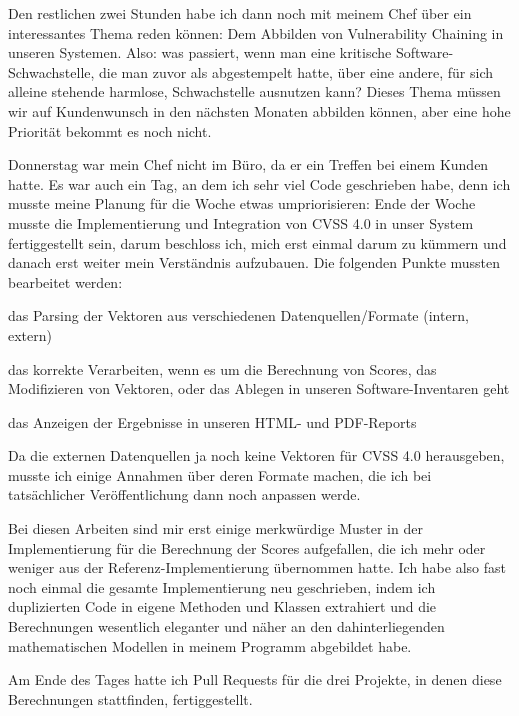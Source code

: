 Den restlichen zwei Stunden habe ich dann noch mit meinem Chef über ein interessantes Thema reden können: Dem Abbilden von Vulnerability Chaining in unseren Systemen.
Also: was passiert, wenn man eine kritische Software-Schwachstelle, die man zuvor als  abgestempelt hatte, über eine andere, für sich alleine stehende harmlose, Schwachstelle ausnutzen kann?
Dieses Thema müssen wir auf Kundenwunsch in den nächsten Monaten abbilden können, aber eine hohe Priorität bekommt es noch nicht.


Donnerstag war mein Chef nicht im Büro, da er ein Treffen bei einem Kunden hatte.
Es war auch ein Tag, an dem ich sehr viel Code geschrieben habe, denn ich musste meine Planung für die Woche etwas umpriorisieren:
Ende der Woche musste die Implementierung und Integration von CVSS 4.0 in unser System fertiggestellt sein, darum beschloss ich, mich erst einmal darum zu kümmern und danach erst weiter mein Verständnis aufzubauen.
Die folgenden Punkte mussten bearbeitet werden:

\begin{smitemize}
    \item das Parsing der Vektoren aus verschiedenen Datenquellen/Formate (intern, extern)
    \item das korrekte Verarbeiten, wenn es um die Berechnung von Scores, das Modifizieren von Vektoren, oder das Ablegen in unseren Software-Inventaren geht
    \item das Anzeigen der Ergebnisse in unseren HTML- und PDF-Reports
\end{smitemize}

Da die externen Datenquellen ja noch keine Vektoren für CVSS 4.0 herausgeben, musste ich einige Annahmen über deren Formate machen, die ich bei tatsächlicher Veröffentlichung dann noch anpassen werde.

Bei diesen Arbeiten sind mir erst einige merkwürdige Muster in der Implementierung für die Berechnung der Scores aufgefallen, die ich mehr oder weniger aus der Referenz-Implementierung übernommen hatte.
Ich habe also fast noch einmal die gesamte Implementierung neu geschrieben, indem ich duplizierten Code in eigene Methoden und Klassen extrahiert und die Berechnungen wesentlich eleganter und näher an den dahinterliegenden mathematischen Modellen in meinem Programm abgebildet habe.

Am Ende des Tages hatte ich Pull Requests für die drei Projekte, in denen diese Berechnungen stattfinden, fertiggestellt.

